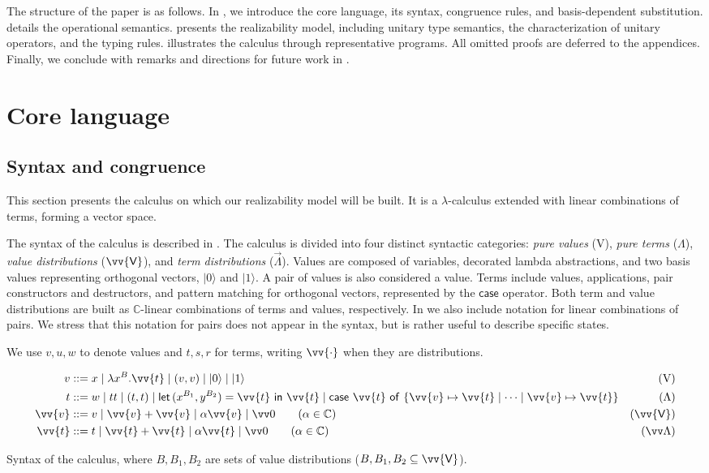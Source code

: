 \documentclass[runningheads,orivec,envcountsame,envcountsect]{llncs}
\newcommand\ket[1]{\ensuremath{|#1\rangle}}
\newcommand\s[1]{\ensuremath{\mathsf{#1}}}
\newcommand\Val{{\s V}}
\DeclareRobustCommand{\ValD}{\ensuremath{\vv{\mathsf{V}}}}
\def\C{\mathbb{C}}            %
\def\Val{\mathrm{V}}          %
\def\Pair#1#2{(#1,#2)} %
\def\Lam#1#2#3{\lambda#1^{#2}{.}#3} %
\def\letkeyword{\mathsf{let}}
\def\inkeyword{\mathsf{in}}
\def\LetP#1#2#3#4#5#6{\letkeyword\,\Pair{#1^{#2}}{#3^{#4}}=#5~\inkeyword~#6}
\def\gencase#1#2#3#4#5{\ensuremath{\mathsf{case}~#1~\mathsf{of}~\{#2\mapsto #4 \mid \dotsb \mid #3\mapsto #5\}}}
\begin{document}
The structure of the paper is as follows.  In
, we introduce the core
language, its syntax, congruence rules, and basis-dependent substitution.
 details the
operational semantics.  
presents the realizability model, including
unitary type semantics, the characterization of unitary operators, and the
typing rules.   illustrates the
calculus through representative programs.  All omitted proofs are deferred to
the appendices.  Finally, we conclude with remarks and directions for future
work in .

\section{Core language}\label{sec:calculus}
\subsection{Syntax and congruence}
This section presents the calculus on which our realizability model will be
built. It is a $\lambda$-calculus extended with linear combinations of terms,
forming a vector space. 

The syntax of the calculus is described in
. The calculus is divided into four
distinct syntactic categories: \emph{pure values} ($\Val$), \emph{pure terms}
($\Lambda$), \emph{value distributions} ($\ValD$), and \emph{term
distributions} ($\vec\Lambda$). Values are composed of variables, decorated
lambda abstractions, and two basis values representing orthogonal vectors,
$\ket 0$ and $\ket 1$. A pair of values is also considered a value.  Terms
include values, applications, pair constructors and destructors, and pattern
matching for orthogonal vectors, represented by the $\mathsf{case}$ operator.
Both term and value distributions are built as $\C$-linear combinations of
terms and values, respectively. In 
we also include notation for linear combinations of
pairs. We stress that this notation for pairs does not appear in the syntax,
but is rather useful to describe specific states.

We use $v,u,w$ to denote values and $t,s,r$ for terms, writing $\vv{\cdot}$ when
they are distributions.

\begin{table}[t]
  \begin{align*}
    v &::= x \mid \Lam{x}B{\vv{t}} \mid (v, v) \mid \ket{0} \mid \ket{1} &
    (\Val)\\
    t &::= w \mid tt \mid (t,t) \mid
    \LetP{x}{B_1}{y}{B_2}{\vv{t}}{\vv{t}}\mid
    \gencase{\vv{t}}{\vv{v}}{\vv{v}}{\vv{t}}{\vv{t}} &
    (\Lambda) \\
    \vv{v} &::= v \mid \vv{v}+\vv{v} \mid \alpha \vv{v} \mid \vv 0
    \qquad\hfill(\alpha\in\C) & (\ValD) \\
    \vv{t} &::= t \mid \vv{t}+\vv{t} \mid \alpha \vv{t} \mid \vv 0
    \qquad\hfill(\alpha\in\C) & (\vv \Lambda)
  \end{align*}
  \caption{Syntax of the calculus, where $B, B_1, B_2$ are sets of value
  distributions ($B, B_1, B_2 \subseteq \ValD$).}
  \label{tab:Syntax}
\end{table}
\end{document}
